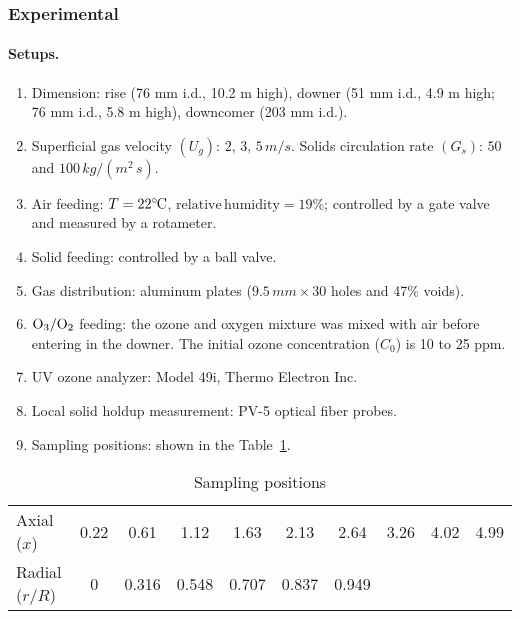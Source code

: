 \subsubsection{Experimental}
\paragraph{Setups. }
\begin{enumerate}
    \item Dimension: rise (76 mm i.d., 10.2 m high), 
    downer (51 mm i.d., 4.9 m high; 76 mm i.d., 5.8 m high), 
    downcomer (203 mm i.d.). 

    \item Superficial gas velocity $(U_g)$: $2,\,3,\,5\,\si{m/s}$. 
    Solids circulation rate $(G_s)$: $50$ and $100\,\si{kg/(m^2\,s)}$.
    
    \item Air feeding: $T = 22 ^\circ\hspace{-0.09em}\mathrm{C}$, $\mathrm{relative\, humidity} = 19\%$; 
    controlled by a gate valve and measured by a rotameter.
    
    \item Solid feeding: controlled by a ball valve.
    
    \item Gas distribution: aluminum plates ($9.5\,\si{mm}\times 30$ holes and 47$\%$ voids).
    
    \item $\ce{O_3} / \ce{O_2}$ feeding: the ozone and oxygen mixture was mixed with air before entering in the downer. 
    The initial ozone concentration ($C_0$) is 10 to 25 ppm.
    
    \item UV ozone analyzer: Model 49i, Thermo Electron Inc.
    
    \item Local solid holdup measurement: PV-5 optical fiber probes.
    
    \item Sampling positions: shown in the Table~\ref{tab: sampling positions}.
\end{enumerate}

\begin{table}[!h]
    \centering
    \caption{Sampling positions}
    \label{tab: sampling positions}
    \begin{tabular}{lccccccccc}
        \toprule
        Axial ($x$) & 0.22 & 0.61 & 1.12 & 1.63 & 2.13 & 2.64 & 3.26 & 4.02 & 4.99 \\
        Radial ($r/R$) & 0 & 0.316 & 0.548 & 0.707 & 0.837 & 0.949 & & &  \\
        \bottomrule
    \end{tabular}
\end{table}

